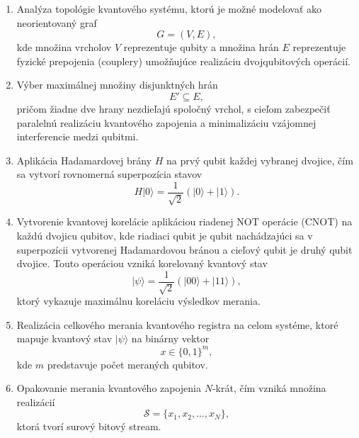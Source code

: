 \begin{enumerate}
  \item Analýza topológie kvantového systému, ktorú je možné modelovať ako neorientovaný graf
  \begin{equation}
    G = (V, E),\label{eq:equation11}
  \end{equation}
  kde množina vrcholov $V$ reprezentuje qubity a množina hrán $E$ reprezentuje fyzické prepojenia (couplery) umožňujúce realizáciu dvojqubitových operácií.

  \item Výber maximálnej množiny disjunktných hrán
  \begin{equation}
    E' \subseteq E,\label{eq:equation10}
  \end{equation}
  pričom žiadne dve hrany nezdieľajú spoločný vrchol, s cieľom zabezpečiť paralelnú realizáciu kvantového zapojenia a minimalizáciu vzájomnej interferencie medzi qubitmi.


  \item Aplikácia Hadamardovej brány $H$ na prvý qubit každej vybranej dvojice, čím sa vytvorí rovnomerná superpozícia stavov
  \begin{equation}
    H \lvert 0 \rangle = \frac{1}{\sqrt{2}} \left( \lvert 0 \rangle + \lvert 1 \rangle \right).\label{eq:equation8}
  \end{equation}

  \item Vytvorenie kvantovej korelácie aplikáciou riadenej NOT operácie (CNOT) na každú dvojicu qubitov,
  kde riadiaci qubit je qubit nachádzajúci sa v superpozícii vytvorenej Hadamardovou bránou a cieľový qubit je druhý qubit dvojice.
  Touto operáciou vzniká korelovaný kvantový stav
  \begin{equation}
    \lvert \psi \rangle = \frac{1}{\sqrt{2}} \left( \lvert 00 \rangle + \lvert 11 \rangle \right),\label{eq:equation7}
  \end{equation}
  ktorý vykazuje maximálnu koreláciu výsledkov merania.

  \item Realizácia celkového merania kvantového registra na celom systéme, ktoré mapuje kvantový stav $\lvert \psi \rangle$ na binárny vektor
  \begin{equation}
    x \in \{0,1\}^{m},\label{eq:equation6}
  \end{equation}
  kde $m$ predstavuje počet meraných qubitov.

  \item Opakovanie merania kvantového zapojenia $N$-krát, čím vzniká množina realizácií
  \begin{equation}
    \mathcal{S} = \{ x_1, x_2, \dots, x_N \},\label{eq:equation5}
  \end{equation}
  ktorá tvorí surový bitový stream.


\end{enumerate}
